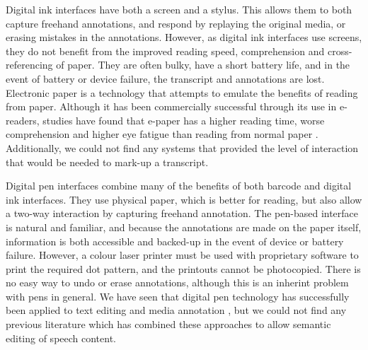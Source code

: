 Digital ink interfaces have both a screen and a stylus. This allows them to both capture freehand annotations, and
respond by replaying the original media, or erasing mistakes in the annotations.  However, as digital ink interfaces
use screens, they do not benefit from the improved reading speed, comprehension and cross-referencing of paper. They
are often bulky, have a short battery life, and in the event of battery or device failure, the transcript and
annotations are lost.  Electronic paper is a technology that attempts to emulate the benefits of reading from paper.
Although it has been commercially successful through its use in e-readers, studies have found that e-paper has a higher
reading time, worse comprehension and higher eye fatigue than reading from normal paper \citep{Jeong2012, Daniel2013}.
Additionally, we could not find any systems that provided the level of interaction that would be needed to mark-up a
transcript.



Digital pen interfaces combine many of the benefits of both barcode and digital ink interfaces. They use physical
paper, which is better for reading, but also allow a two-way interaction by capturing freehand annotation. The
pen-based interface is natural and familiar, and because the annotations are made on the paper itself, information is
both accessible and backed-up in the event of device or battery failure. However, a colour laser printer must be used
with proprietary software to print the required dot pattern, and the printouts cannot be photocopied. There is no easy
way to undo or erase annotations, although this is an inherint problem with pens in general.  We have seen that digital
pen technology has successfully been applied to text editing \citep{Weibel2008} and media annotation \citep{Fouse2011},
but we could not find any previous literature which has combined these approaches to allow semantic editing of speech
content.

